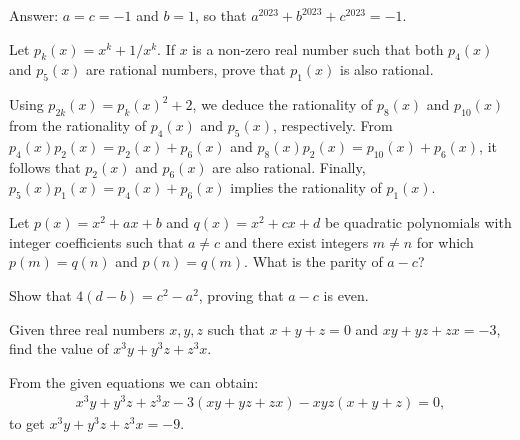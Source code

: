 \documentclass[12pt,a4paper]{memoir}
\theoremstyle{definition}
\begin{document}
\begin{solution}
	Answer: $a=c=-1$ and $b=1$, so that $a^{2023} + b^{2023} + c^{2023}=-1$.
\end{solution}



\begin{tcolorbox}
	\begin{question}
		Let $p_k(x)=x^k+1/x^k$. If $x$ is a non-zero real number such that both $p_4(x)$ and $p_5(x)$ are rational numbers, prove that $p_1(x)$ is also rational.
	\end{question}
\end{tcolorbox}

\begin{solution}
	Using $p_{2k}(x)=p_k(x)^2+2$, we deduce the rationality of $p_8(x)$ and $p_{10}(x)$ from the rationality of 
	$p_4(x)$ and $p_5(x)$, respectively. From $p_4(x)p_2(x)=p_2(x)+p_6(x)$ and $p_8(x)p_2(x)=p_{10}(x)+p_6(x)$, it follows that $p_2(x)$ and $p_6(x)$ are also rational. Finally, $p_5(x)p_1(x)=p_4(x)+p_6(x)$ implies the rationality of $p_1(x)$.
\end{solution}



\begin{tcolorbox}
	\begin{question}
		Let $p(x)=x^2+ax+b$ and $q(x)=x^2+cx+d$ be quadratic polynomials with integer coefficients such that $a \neq c$ and there exist integers $m\neq n$ for which $p(m)=q(n)$ and $p(n)=q(m)$. What is the parity of $a-c$?
	\end{question}
\end{tcolorbox}

\begin{solution}
	Show that $4(d-b)=c^2-a^2$, proving that $a-c$ is even.
\end{solution}


\begin{tcolorbox}
	\begin{question}
		Given three real numbers $x,y,z$ such that $x+y+z=0$ and $xy+yz+zx=-3$, find the value of $x^3y+y^3z+z^3x$.
	\end{question}
\end{tcolorbox}

\begin{solution}[name=Solution by CRMO 2012]
	From the given equations we can obtain:
	\begin{align*}
		x^3y+y^3z+z^3x-3(xy+yz+zx)-xyz(x+y+z)=0,
	\end{align*}
	to get $x^3y+y^3z+z^3x=-9$.
\end{solution}
\end{document}
